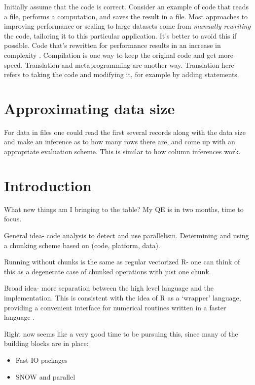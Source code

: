 \documentclass[12pt]{article}
\begin{document}
Initially assume that the code is correct. Consider an example of code that
reads a file, performs a computation, and saves the result in a file.
Most approaches to improving performance or scaling to large datasets
come from \emph{manually rewriting} the code, tailoring it to this
particular application. It's better to avoid this if possible.  Code that's
rewritten for performance results in an increase in complexity
\cite{matloff2015parallel}.  Compilation is one way to keep the original
code and get more speed. Translation and metaprogramming are another way.
Translation here refers to taking the code and modifying it, for example by
adding statements.


\section{Approximating data size}

For data in files one could read the first several records along with the
data size and make an inference as to how many rows there are, and come up
with an appropriate evaluation scheme. This is similar to how column
inferences work.

\section{Introduction}

What new things am I bringing to the table? My QE is in two months, time to
focus.

General idea- code analysis to detect and use parallelism. Determining and
using a chunking scheme based on (code, platform, data).

Running without chunks is the same as regular vectorized R- one can think
of this as a degenerate case of chunked operations with just one chunk.

Broad idea- more separation between the high level language
and the implementation. This is consistent with the idea of R as a `wrapper'
language, providing a convenient interface for numerical routines written
in a faster language \cite{chambers2016extending}.

Right now seems like a very good time to be pursuing this, since many of the
building blocks are in place:
\begin{itemize}
    \item Fast IO packages
    \item SNOW and parallel
\end{itemize}
\end{document}
